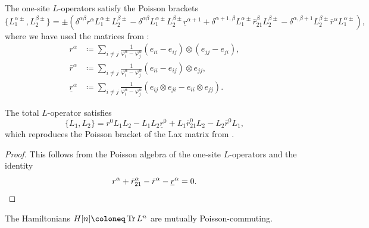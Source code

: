 \begin{prop}
    The one-site $L$-operators satisfy the Poisson brackets
    \begin{equation}
        \{ L_1^{\alpha\pm}, L_2^{\beta\pm} \} = \pm(\delta^{\alpha\beta} r^\alpha L_1^{\alpha\pm} L_2^{\beta\pm} - \delta^{\alpha\beta} L_1^{\alpha\pm} L_2^{\beta\pm} \underline r^{\alpha+1} + \delta^{\alpha+1,\beta} L_1^{\alpha\pm} \bar r_{21}^\beta L_2^{\beta\pm} - \delta^{\alpha,\beta+1} L_2^{\beta\pm} \bar r^\alpha L_1^{\alpha\pm}),
    \end{equation}
    where we have used the matrices from \cite{arutyunov_quantum_1996}:
    \begin{align}\label{eq:ratMat}
        r^\alpha &\coloneq \sum_{i \neq j} \frac{1}{\varphi_i^\alpha-\varphi_j^\alpha} (e_{ii}-e_{ij}) \otimes (e_{jj} - e_{ji}), \\
        \bar r^\alpha &\coloneq \sum_{i \neq j} \frac{1}{\varphi_i^\alpha-\varphi_j^\alpha} (e_{ii}-e_{ij}) \otimes e_{jj},
        \\[4pt]
        \underline r^\alpha &\coloneq \sum_{i \neq j} \frac{1}{\varphi_i^\alpha-\varphi_j^\alpha} (e_{ij} \otimes e_{ji} - e_{ii} \otimes e_{jj}).
    \end{align}    
\end{prop}

\begin{corollary}
    The total $L$-operator satisfies
    \begin{equation}
        \{ L_1, L_2 \} = r^0 L_1 L_2 - L_1 L_2 \underline r^0 + L_1 \bar r_{21}^0 L_2 - L_2 \bar r^0 L_1,
    \end{equation}
    which reproduces the Poisson bracket of the Lax matrix from \cite{arutyunov_hamiltonian_1998}.
\end{corollary}

\begin{proof}
    This follows from the Poisson algebra of the one-site $L$-operators and the identity
    \begin{equation*}
        r^\alpha + \bar r_{21}^\alpha - \bar r^\alpha - \underline r^\alpha = 0.
        \vspace{-1.5\baselineskip}
    \end{equation*}
\end{proof}

\begin{corollary}
    The Hamiltonians $H[n] \coloneq \Tr L^n$ are mutually Poisson-commuting.
\end{corollary}

